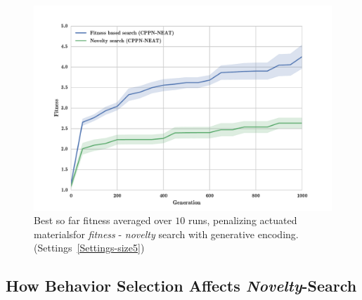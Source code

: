 \begin{figure}[t!]
\centering
\includegraphics[width=1.0\textwidth]{../Figures/Results/FitNovSize5Pen2.pdf}
\caption[]{Best so far fitness averaged over $10$ runs, penalizing actuated materials\footnotemark for \emph{fitness} - \emph{novelty} search with generative encoding. (Settings~\ref{Settings-size5})}
\label{fig:FitNovSize5Pen2}
\end{figure}

\subsection{How Behavior Selection Affects \emph{Novelty}-Search}

